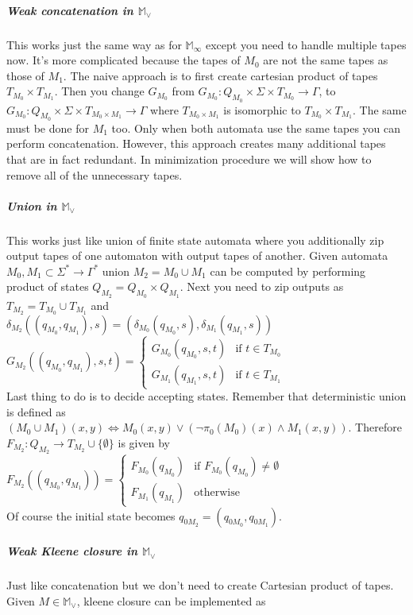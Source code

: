 \documentclass[12pt]{article}
\begin{document}
\subparagraph{Weak concatenation in $\mathbb{M}_\vee$} This works just the same way as for $\mathbb{M}_\infty$ except you need to handle multiple tapes now. It's more complicated because the tapes of $M_0$ are not the same tapes as those of $M_1$. The naive approach is to first create cartesian product of tapes $T_{M_0} \times T_{M_1}$. Then you change $G_{M_0}$ from $G_{M_0} : Q_{M_0} \times \Sigma \times T_{M_0} \rightarrow \Gamma$, to $G_{M_0} : Q_{M_0} \times \Sigma \times T_{M_0 \times M_1} \rightarrow \Gamma$ where $T_{M_0 \times M_1}$ is isomorphic to $T_{M_0} \times T_{M_1}$. The same must be done for $M_1$ too. Only when both automata use the same tapes you can perform concatenation. However, this approach creates many additional tapes that are in fact redundant. In minimization procedure we  will show how to remove all of the unnecessary tapes.

\subparagraph{Union in $\mathbb{M}_\vee$}  This works just like union of finite state automata where you additionally zip output tapes of one automaton with output tapes of another. Given automata $M_0,M_1 \subset \Sigma^* \rightarrow \Gamma^*$ union $M_2=M_0 \cup M_1$ can be computed by performing product of states $Q_{M_2} = Q_{M_0} \times Q_{M_1}$. Next you need to zip outputs as $T_{M_2} = T_{M_0} \cup T_{M_1}$  and \\
$\delta_{M_2}((q_{M_0},q_{M_1}),s) = 
(\delta_{M_0}(q_{M_0},s),\delta_{M_1}(q_{M_1},s))$ \\
$G_{M_2}((q_{M_0},q_{M_1}),s,t) = \begin{cases}
G_{M_0}(q_{M_0},s,t)  & \mbox{if }  t \in T_{M_0} \\
G_{M_1}(q_{M_1},s,t)  & \mbox{if }  t \in T_{M_1}
\end{cases}$\\
Last thing to do is to decide accepting states. Remember that deterministic union is defined as $(M_0 \cup M_1)(x,y) \iff M_0(x,y) \vee (\neg \pi_0(M_0)(x) \wedge M_1(x,y))$. Therefore $F_{M_2} : Q_{M_2}  \rightarrow T_{M_2} \cup \{\emptyset\}$ is given by \\
$F_{M_2}((q_{M_0},q_{M_1})) = \begin{cases}
F_{M_0}(q_{M_0})  & \mbox{if }  F_{M_0}(q_{M_0}) \ne \emptyset  \\
F_{M_1}(q_{M_1})  & \mbox{otherwise} 
\end{cases} $ \\
Of course the initial state becomes $q_{0M_2}=(q_{0M_0},q_{0M_1})$.

\subparagraph{Weak Kleene closure in $\mathbb{M}_\vee$} Just like concatenation but we don't need to create Cartesian product of tapes. Given $M \in \mathbb{M}_\vee$, kleene closure can be implemented as
\end{document}

